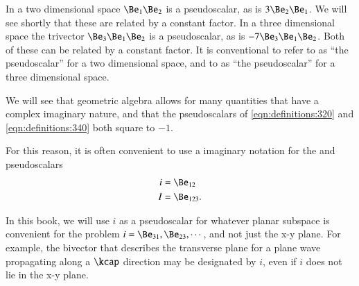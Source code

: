 
In a two dimensional space \( \Be_1 \Be_2 \) is a pseudoscalar, as is \( 3 \Be_2 \Be_1 \).
We will see shortly that these are related by a constant factor.
In a three dimensional space the trivector
\( \Be_3 \Be_1 \Be_2 \) is a pseudoscalar, as is \( - 7 \Be_3 \Be_1 \Be_2 \).
Both of these can be related by a constant factor.
It is conventional to refer to
as ``the pseudoscalar'' for a two dimensional space, and to
as ``the pseudoscalar'' for a three dimensional space.

We will see that geometric algebra allows for many quantities that have a complex imaginary nature, and that the pseudoscalars of \cref{eqn:definitions:320} and \cref{eqn:definitions:340} both square to \(-1\).

For this reason, it is often convenient to use a imaginary notation for the  and  pseudoscalars
\begin{dmath}\label{eqn:multivector_nomenclature:42}
\begin{aligned}
i &= \Be_{12} \\
I &= \Be_{123}.
\end{aligned}
\end{dmath}

In this book, we will use \( i \) as a pseudoscalar for whatever planar subspace is convenient for the problem \( i = \Be_{31}, \Be_{23}, \cdots \), and not just the x-y plane.  For example, the bivector that describes the transverse plane for a plane wave propagating along a \( \kcap \) direction may be designated by \( i \), even if \( i \) does not lie in the x-y plane.

